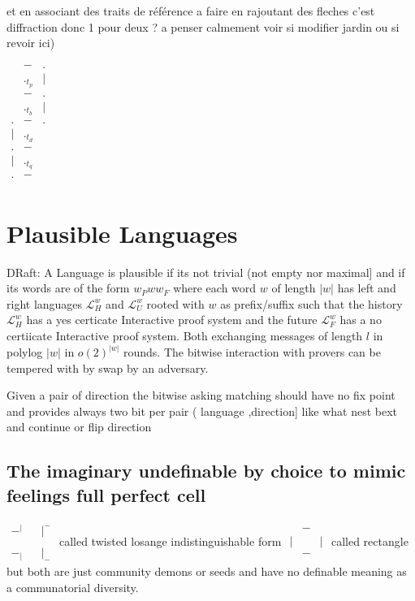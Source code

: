 \documentclass{article}
\begin{document}
et en associant des traits de référence a faire en rajoutant des fleches  c'est diffraction donc 1 pour deux ? a penser calmement voir si modifier jardin ou si revoir ici)

 $\begin{matrix} 
 &-&.\\
&._{t_p}&|\\
&-&.\\
&._{t_b}&|\\
.&-&.\\
|&._{t_d}&\\
.&-&\\
|&._{t_q}&\\
.&-&\\
\end{matrix}$

\section{Plausible  Languages} \label{sec:simple}
DRaft:
A Language is plausible if its not trivial (not empty nor maximal] and   if its words are of the form $w_Pww_F$ where each word $w$ of length $|w|$ has left and right languages $\mathcal {L}_H^w$ and  $\mathcal {L}_U^w$  rooted with $w$ as prefix/suffix such that  the history  $\mathcal {L}_H^w$ has a yes certicate Interactive proof system and the future  $\mathcal {L}_F^w$ has a no certiicate Interactive proof system. Both exchanging messages of length  $l$ in polylog  $|w|$ in $o(2)^{|w|}$ rounds.   
The bitwise interaction with provers can be tempered with by swap by an adversary.  

Given a pair of direction the bitwise asking matching should have no fix point and provides always  two  bit per pair ( language ,direction]  like what nest bext and continue or flip direction 
 
\subsection{The imaginary undefinable by choice to mimic feelings full perfect cell} 

 $\begin{matrix} -^|&&|^- \\ &&\\-_|&&|_-\end{matrix}$  called twisted losange indistinguishable  form 
 $\begin{matrix} &-&\\
                          |&&|\\
                          &-&
       \end{matrix}$ called rectangle but both are just community demons or seeds and have no definable meaning as a communatorial diversity.
\end{document}

